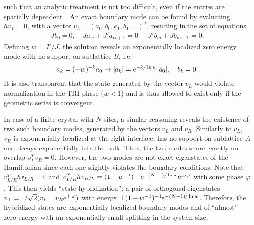 such that an analytic treatment is not too difficult, even if the entries are spatially dependent~\cite{Asboth2016}.
An exact boundary mode can be found by evaluating $hv_L=0$, with a vector $v_L = (a_0,b_0,a_1,b_1,\dots)^T$, resulting in the set of equations
\begin{align}
    J b_0 = 0,
    \quad
    Ja_m + J' a_{m+1} = 0,
    \quad
    J' b_m + J b_{m+1} = 0.
\end{align}
Defining $w=J'/J$, the solution reveals an exponentially localized zero energy mode with no support on sublattice $B$, i.e.
\begin{align}
    a_k=(-w)^{-k} a_0 \rightarrow |a_k| = \mathrm e^{-k/\ln w}|a_0|,
    \quad
    b_k = 0.
    \label{eq:boundary_mode}
\end{align}
It is also transparent that the state generated by the vector $v_L$ would violate normalization in the TRI phase ($w<1$) and is thus allowed to exist only if the geometric series is convergent.

In case of a finite crystal with $N$ sites, a similar reasoning reveals the existence of two such boundary modes, generated by the vectors $v_L$ and $v_R$.
Similarly to $v_L$, $v_R$ is exponentially localized at the right interface, has no support on sublattice $A$ and decays exponentially into the bulk.
Thus, the two modes share exactly no overlap $v_L^T v_R = 0$.
However, the two modes are not exact eigenstates of the Hamiltonian since each one slightly violates the boundary conditions.
Note that $v_{L/R}^T h v_{L/R} = 0$ and $v_{L/R}^T h v_{R/L} = (1-w^{-1})^{-1}\mathrm e^{-(N-1)/\ln w}\mathrm e^{\pm\mathrm i\varphi}$ with some phase $\varphi$.
This then yields ``state hybridization'': a pair of orthogonal eigenstates $v_\pm = 1/\sqrt2(v_L \pm v_R\mathrm e^{\pm\mathrm i\varphi})$ with energy $\pm(1-w^{-1})^{-1}\mathrm e^{-(N-1)/\ln w}$.
Therefore, the hybridized states are exponentially localized boundary modes and of ``almost'' zero energy with an exponentially small splitting in the system size.
%
%
